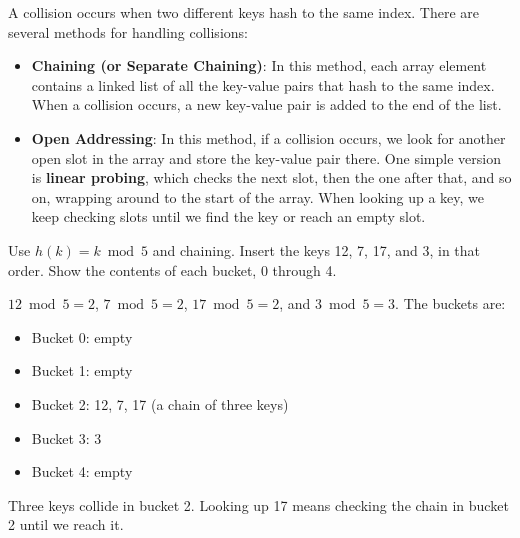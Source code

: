 A collision occurs when two different keys hash to the same
index. There are several methods for handling
collisions:

\begin{itemize}
    \item \textbf{Chaining (or Separate Chaining)}: In this method,
      each array element contains a linked list of all the key-value
      pairs that hash to the same index. When a collision occurs, a
      new key-value pair is added to the end of the list.
    \item \textbf{Open Addressing}: In this
      method, if a collision occurs, we look for another open slot in the array and store the key-value pair there. One simple version is \textbf{linear probing}, which checks the next slot, then the one after that, and so on, wrapping around to the start of the array. When
      looking up a key, we keep checking slots until we find the key
      or reach an empty slot.
\end{itemize}

\begin{Exercise}[title={Chaining with a Hash Function}, label=hash1]
Use $h(k) = k \bmod 5$ and chaining. Insert the keys 12, 7, 17, and 3, in that order. Show the contents of each bucket, 0 through 4.
\end{Exercise}
\begin{Answer}[ref=hash1]
$12 \bmod 5 = 2$, $7 \bmod 5 = 2$, $17 \bmod 5 = 2$, and $3 \bmod 5 = 3$. The buckets are:
\begin{itemize}
    \item Bucket 0: empty
    \item Bucket 1: empty
    \item Bucket 2: 12, 7, 17 (a chain of three keys)
    \item Bucket 3: 3
    \item Bucket 4: empty
\end{itemize}
Three keys collide in bucket 2. Looking up 17 means checking the chain in bucket 2 until we reach it.
\end{Answer}

